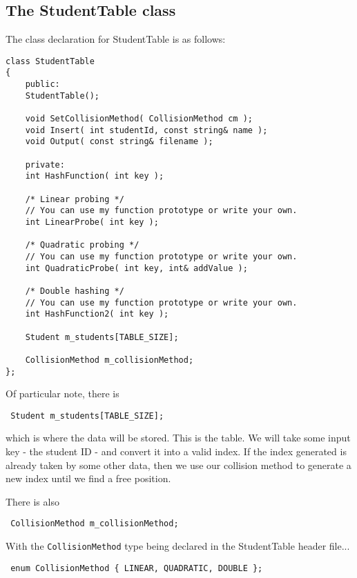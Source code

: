 \documentclass[a4paper,12pt,oneside]{book}
\begin{document}

\subsection{The StudentTable class}

The class declaration for StudentTable is as follows:

\begin{lstlisting}[style=code]
class StudentTable
{
    public:
    StudentTable();

    void SetCollisionMethod( CollisionMethod cm );
    void Insert( int studentId, const string& name );
    void Output( const string& filename );

    private:
    int HashFunction( int key );

    /* Linear probing */
    // You can use my function prototype or write your own.
    int LinearProbe( int key );

    /* Quadratic probing */
    // You can use my function prototype or write your own.
    int QuadraticProbe( int key, int& addValue );

    /* Double hashing */
    // You can use my function prototype or write your own.
    int HashFunction2( int key );

    Student m_students[TABLE_SIZE];

    CollisionMethod m_collisionMethod;
};
\end{lstlisting}

Of particular note, there is

\begin{center}
    \texttt{
        Student m\_students[TABLE\_SIZE];
    }
\end{center}

which is where the data will be stored. This is the table. We will
take some input key - the student ID - and convert it into a valid index.
If the index generated is already taken by some other data, then we
use our collision method to generate a new index until we find a free position.

There is also

\begin{center}
    \texttt{
        CollisionMethod m\_collisionMethod;
    }
\end{center}

With the \texttt{CollisionMethod} type being declared in the StudentTable header file...

\begin{center}
    \texttt{
        enum CollisionMethod \{ LINEAR, QUADRATIC, DOUBLE \};
    }
\end{center}
\end{document}
